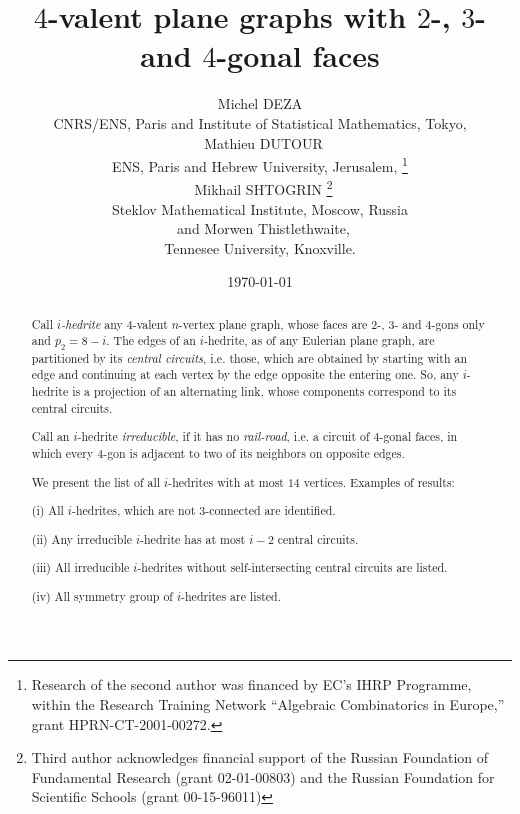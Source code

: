 \documentclass[12pt]{article}
\begin{document}
\title{$4$-valent plane graphs with $2$-, $3$- and $4$-gonal faces}




\author{Michel DEZA\\
CNRS/ENS, Paris and Institute of Statistical Mathematics, Tokyo,\\
\ Mathieu DUTOUR \\
ENS, Paris and Hebrew University, Jerusalem,
\footnote{Research of the second author was financed by EC's IHRP Programme, within the Research Training Network ``Algebraic Combinatorics in Europe,'' grant HPRN-CT-2001-00272.}\\
\ Mikhail SHTOGRIN 
\thanks{Third author acknowledges financial support of the Russian Foundation of Fundamental Research (grant 02-01-00803) and the Russian Foundation for Scientific Schools (grant 00-15-96011)}\\
Steklov Mathematical Institute, Moscow, Russia\\
\ and Morwen Thistlethwaite,\\
Tennesee University, Knoxville.
}
\date{\today}


\maketitle



\begin{abstract}
Call {\em $i$-hedrite} any $4$-valent $n$-vertex plane graph, whose 
faces are $2$-, $3$- and $4$-gons only and $p_2=8-i$. The edges of an $i$-hedrite, as of 
any Eulerian plane graph, are partitioned
by its {\em central circuits}, i.e. those, which are obtained by starting with an
edge and continuing at each vertex by the edge opposite the entering one. 
So, any $i$-hedrite is a projection of an alternating link, whose components
correspond to its central circuits.

Call an $i$-hedrite {\em irreducible}, if it has no 
{\em rail-road}, i.e. a 
circuit of $4$-gonal faces, in which every $4$-gon is adjacent to two of its 
neighbors on opposite edges.

We present the list of all $i$-hedrites with at most $14$ vertices. Examples of results: 

(i) All $i$-hedrites, which are not $3$-connected are identified.

(ii) Any irreducible $i$-hedrite has at most $i-2$ central circuits.

(iii) All irreducible $i$-hedrites without self-intersecting central circuits are listed.

(iv) All symmetry group of $i$-hedrites are listed.

\end{abstract}
\end{document}
